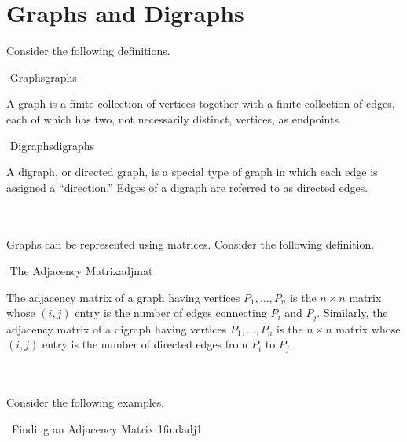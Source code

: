 \section{Graphs and Digraphs}

    Consider the following definitions.
    \begin{definition}{\Stop\,\,Graphs}{graphs}
        
        A graph is a finite collection of vertices together with a finite collection of edges, each of which has two, not necessarily distinct, vertices, as endpoints.

    \end{definition}
    \begin{definition}{\Stop\,\,Digraphs}{digraphs}
        
        A digraph, or directed graph, is a special type of graph in which each edge is assigned a ``direction.'' Edges of a digraph are referred to as directed edges.

    \end{definition}
    \vphantom
    \\
    \\
    Graphs can be represented using matrices. Consider the following definition.
    \begin{definition}{\Stop\,\,The Adjacency Matrix}{adjmat}

        The adjacency matrix of a graph having vertices \(P_1,\ldots,P_n\) is the \(n\times n\) matrix whose \((i,j)\) entry is the number of edges connecting \(P_i\) and \(P_j\). Similarly, the adjacency matrix of a digraph having vertices \(P_1,\ldots,P_n\) is the \(n\times n\) matrix whose \((i,j)\) entry is the number of directed edges from \(P_i\) to \(P_j\).
        
    \end{definition}
    \pagebreak
    \vphantom
    \\
    \\
    Consider the following examples.
    \begin{example}{\Difficulty\,\Difficulty\,\,Finding an Adjacency Matrix 1}{findadj1}
        
    \end{example}